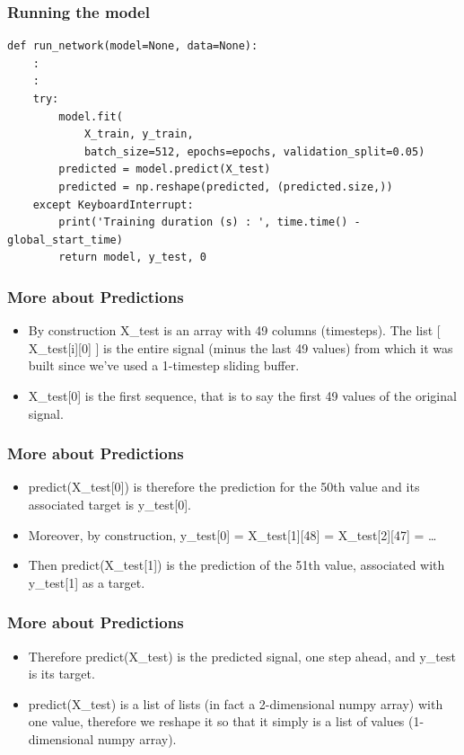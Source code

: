 \begin{frame}[fragile] \frametitle{Running the model}
\begin{lstlisting}
def run_network(model=None, data=None):
	:
	:
	try:
        model.fit(
            X_train, y_train,
            batch_size=512, epochs=epochs, validation_split=0.05)
        predicted = model.predict(X_test)
        predicted = np.reshape(predicted, (predicted.size,))
    except KeyboardInterrupt:
        print('Training duration (s) : ', time.time() - global_start_time)
        return model, y_test, 0
\end{lstlisting}           
\end{frame}

\begin{frame}[fragile] \frametitle{More about Predictions}
\begin{itemize}
\item By construction X\_test is an array with 49 columns (timesteps). The list [ X\_test[i][0] ] is the entire signal (minus the last 49 values) from which it was built since we've used a 1-timestep sliding buffer.
\item X\_test[0] is the first sequence, that is to say the first 49 values of the original signal.
\end{itemize}
\end{frame}


\begin{frame}[fragile] \frametitle{More about Predictions}
\begin{itemize}
\item predict(X\_test[0]) is therefore the prediction for the 50th value and its associated target is y\_test[0]. 
\item Moreover, by construction, y\_test[0] = X\_test[1][48] = X\_test[2][47] = \ldots
\item Then predict(X\_test[1]) is the prediction of the 51th value, associated with y\_test[1] as a target.
\end{itemize}
\end{frame}

\begin{frame}[fragile] \frametitle{More about Predictions}
\begin{itemize}
\item Therefore predict(X\_test) is the predicted signal, one step ahead, and y\_test is its target.
\item predict(X\_test) is a list of lists (in fact a 2-dimensional numpy array) with one value, therefore we reshape it so that it simply is a list of values (1-dimensional numpy array).
\end{itemize}
\end{frame}



